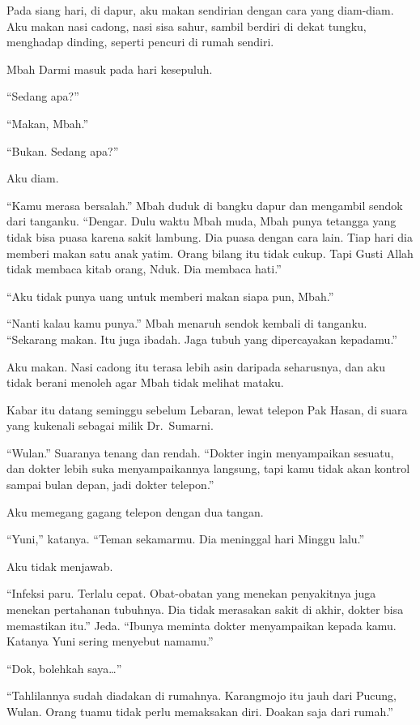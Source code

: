\documentclass[11pt,twoside,openany]{book}
\makeatletter
\newcommand{\scenebreak}{\par\vspace{0.9em}{\centering\textsc{*\hspace{0.7em}*\hspace{0.7em}*}\par}\vspace{0.9em}\@afterindentfalse\@afterheading}
\makeatother
\begin{document}
Pada siang hari, di dapur, aku makan sendirian dengan cara yang diam-diam. Aku makan nasi cadong, nasi sisa sahur, sambil berdiri di dekat tungku, menghadap dinding, seperti pencuri di rumah sendiri.

Mbah Darmi masuk pada hari kesepuluh.

``Sedang apa?''

``Makan, Mbah.''

``Bukan. Sedang apa?''

Aku diam.

``Kamu merasa bersalah.'' Mbah duduk di bangku dapur dan mengambil sendok dari tanganku. ``Dengar. Dulu waktu Mbah muda, Mbah punya tetangga yang tidak bisa puasa karena sakit lambung. Dia puasa dengan cara lain. Tiap hari dia memberi makan satu anak yatim. Orang bilang itu tidak cukup. Tapi Gusti Allah tidak membaca kitab orang, Nduk. Dia membaca hati.''

``Aku tidak punya uang untuk memberi makan siapa pun, Mbah.''

``Nanti kalau kamu punya.'' Mbah menaruh sendok kembali di tanganku. ``Sekarang makan. Itu juga ibadah. Jaga tubuh yang dipercayakan kepadamu.''

Aku makan. Nasi cadong itu terasa lebih asin daripada seharusnya, dan aku tidak berani menoleh agar Mbah tidak melihat mataku.

\scenebreak
Kabar itu datang seminggu sebelum Lebaran, lewat telepon Pak Hasan, di suara yang kukenali sebagai milik Dr.~Sumarni.

``Wulan.'' Suaranya tenang dan rendah. ``Dokter ingin menyampaikan sesuatu, dan dokter lebih suka menyampaikannya langsung, tapi kamu tidak akan kontrol sampai bulan depan, jadi dokter telepon.''

Aku memegang gagang telepon dengan dua tangan.

``Yuni,'' katanya. ``Teman sekamarmu. Dia meninggal hari Minggu lalu.''

Aku tidak menjawab.

``Infeksi paru. Terlalu cepat. Obat-obatan yang menekan penyakitnya juga menekan pertahanan tubuhnya. Dia tidak merasakan sakit di akhir, dokter bisa memastikan itu.'' Jeda. ``Ibunya meminta dokter menyampaikan kepada kamu. Katanya Yuni sering menyebut namamu.''

``Dok, bolehkah saya\ldots{}''

``Tahlilannya sudah diadakan di rumahnya. Karangmojo itu jauh dari Pucung, Wulan. Orang tuamu tidak perlu memaksakan diri. Doakan saja dari rumah.''
\end{document}
